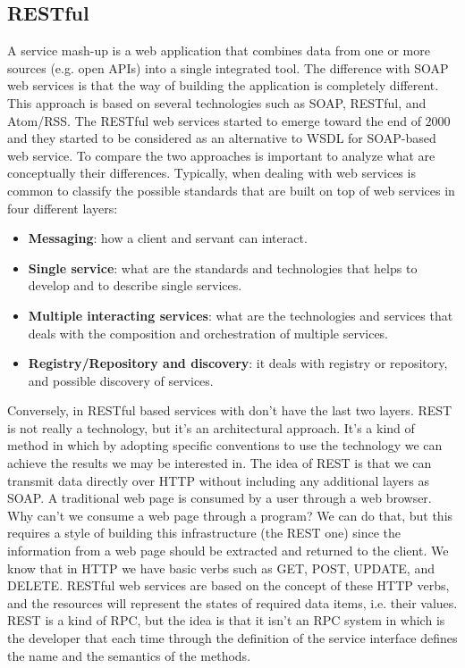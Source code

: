 \subsection{RESTful}
A service mash-up is a web application that combines data from one or more sources (e.g. open APIs) into a single integrated tool.
The difference with SOAP web services is that the way of building the application is completely different.
This approach is based on several technologies such as SOAP, RESTful, and Atom/RSS.
The RESTful web services started to emerge toward the end of $2000$ and they started to be considered as an alternative to WSDL for SOAP-based web service.
To compare the two approaches is important to analyze what are conceptually their differences.
Typically, when dealing with web services is common to classify the possible standards that are built on top of web services in four different layers:
\begin{itemize}
    \item \textbf{Messaging}: how a client and servant can interact.
    \item \textbf{Single service}: what are the standards and technologies that helps to develop and to describe single services.
    \item \textbf{Multiple interacting services}: what are the technologies and services that deals with the composition and orchestration of multiple services.
    \item \textbf{Registry/Repository and discovery}: it deals with registry or repository, and possible discovery of services.
\end{itemize}
Conversely, in RESTful based services with don't have the last two layers.
REST is not really a technology, but it's an architectural approach.
It's a kind of method in which by adopting specific conventions to use the technology we can achieve the results we may be interested in.
The idea of REST is that we can transmit data directly over HTTP without including any additional layers as SOAP.
A traditional web page is consumed by a user through a web browser.
Why can't we consume a web page through a program?
We can do that, but this requires a style of building this infrastructure (the REST one) since the information from a web page should be extracted and returned to the client.
We know that in HTTP we have basic verbs such as GET, POST, UPDATE, and DELETE.
RESTful web services are based on the concept of these HTTP verbs, and the resources will represent the states of required data items, i.e. their values. REST is a kind of RPC, but the idea is that it isn't an RPC system in which is the developer that each time through the definition of the service interface defines the name and the semantics of the methods.
